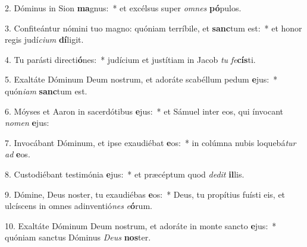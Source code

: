 2. Dóminus in Sion \textbf{ma}gnus:~*  et excélsus super \textit{om}\textit{nes} \textbf{pó}pulos.\

3. Confiteántur nómini tuo magno: quóniam terríbile, et \textbf{sanc}tum est:~*  et honor regis judí\textit{ci}\textit{um} \textbf{dí}ligit.\

4. Tu parásti directi\textbf{ó}nes:~*  judícium et justítiam in Jacob \textit{tu} \textit{fe}\textbf{cís}ti.\

5. Exaltáte Dóminum Deum nostrum, et adoráte scabéllum pedum \textbf{e}jus:~*  quón\textit{i}\textit{am} \textbf{sanc}tum est.\

6. Móyses et Aaron in sacerdótibus \textbf{e}jus:~*  et Sámuel inter eos, qui ínvocant \textit{no}\textit{men} \textbf{e}jus:\

7. Invocábant Dóminum, et ipse exaudiébat \textbf{e}os:~*  in colúmna nubis loquebá\textit{tur} \textit{ad} \textbf{e}os.\

8. Custodiébant testimónia \textbf{e}jus:~*  et præcéptum quod \textit{de}\textit{dit} \textbf{il}lis.\

9. Dómine, Deus noster, tu exaudiébas \textbf{e}os:~*  Deus, tu propítius fuísti eis, et ulcíscens in omnes adinventió\textit{nes} \textit{e}\textbf{ó}rum.\

10. Exaltáte Dóminum Deum nostrum, et adoráte in monte sancto \textbf{e}jus:~*  quóniam sanctus Dóminus \textit{De}\textit{us} \textbf{nos}ter.\

